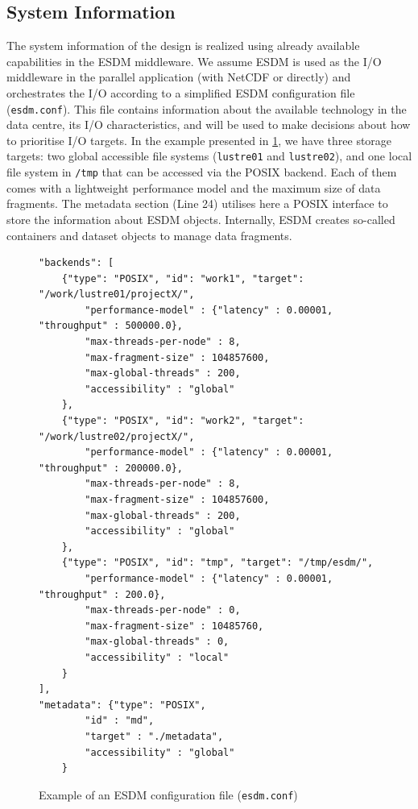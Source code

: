 \documentclass{superfri}
\begin{document}
\subsection{System Information}

The system information of the design is realized using already available capabilities in the ESDM middleware.
We assume ESDM is used as the I/O middleware in the parallel application (with NetCDF or directly) and orchestrates the I/O according to a simplified ESDM configuration file (\texttt{esdm.conf}).
This file contains information about the available technology in the data centre, its I/O characteristics, and will be used to make decisions about how to prioritise I/O targets.
In the example presented in \cref{lst:esdm.conf}, we have three storage targets: two global accessible file systems (\texttt{lustre01} and \texttt{lustre02}), and one local file system in \texttt{/tmp} that can be accessed via the POSIX backend.
Each of them comes with a lightweight performance model and the maximum size of data fragments.
The metadata section (Line 24) utilises here a POSIX interface to store the information about ESDM objects. Internally, ESDM creates so-called containers and dataset objects to manage data fragments.

\begin{figure}[!ht]

\begin{lstlisting}
"backends": [
    {"type": "POSIX", "id": "work1", "target": "/work/lustre01/projectX/",
        "performance-model" : {"latency" : 0.00001, "throughput" : 500000.0},
        "max-threads-per-node" : 8,
        "max-fragment-size" : 104857600,
        "max-global-threads" : 200,
        "accessibility" : "global"
    },
    {"type": "POSIX", "id": "work2", "target": "/work/lustre02/projectX/",
        "performance-model" : {"latency" : 0.00001, "throughput" : 200000.0},
        "max-threads-per-node" : 8,
        "max-fragment-size" : 104857600,
        "max-global-threads" : 200,
        "accessibility" : "global"
    },
    {"type": "POSIX", "id": "tmp", "target": "/tmp/esdm/",
        "performance-model" : {"latency" : 0.00001, "throughput" : 200.0},
        "max-threads-per-node" : 0,
        "max-fragment-size" : 10485760,
        "max-global-threads" : 0,
        "accessibility" : "local"
    }
],
"metadata": {"type": "POSIX",
        "id" : "md",
        "target" : "./metadata",
        "accessibility" : "global"
    }
\end{lstlisting}

\caption{Example of an ESDM configuration file (\texttt{esdm.conf})}
\label{lst:esdm.conf}
\end{figure}
\end{document}
